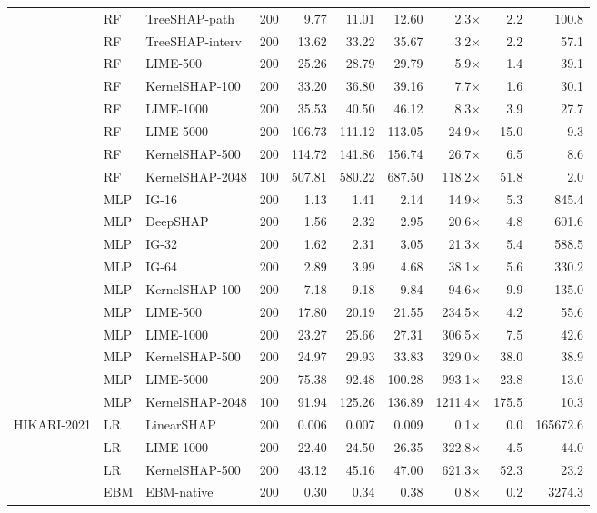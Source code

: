 \begin{longtable}{lllrrrrrrr}
 & RF & TreeSHAP-path & 200 & 9.77 & 11.01 & 12.60 & 2.3$\times$ & 2.2 & 100.8 \\
 & RF & TreeSHAP-interv & 200 & 13.62 & 33.22 & 35.67 & 3.2$\times$ & 2.2 & 57.1 \\
 & RF & LIME-500 & 200 & 25.26 & 28.79 & 29.79 & 5.9$\times$ & 1.4 & 39.1 \\
 & RF & KernelSHAP-100 & 200 & 33.20 & 36.80 & 39.16 & 7.7$\times$ & 1.6 & 30.1 \\
 & RF & LIME-1000 & 200 & 35.53 & 40.50 & 46.12 & 8.3$\times$ & 3.9 & 27.7 \\
 & RF & LIME-5000 & 200 & 106.73 & 111.12 & 113.05 & 24.9$\times$ & 15.0 & 9.3 \\
 & RF & KernelSHAP-500 & 200 & 114.72 & 141.86 & 156.74 & 26.7$\times$ & 6.5 & 8.6 \\
 & RF & KernelSHAP-2048 & 100 & 507.81 & 580.22 & 687.50 & 118.2$\times$ & 51.8 & 2.0 \\
 & MLP & IG-16 & 200 & 1.13 & 1.41 & 2.14 & 14.9$\times$ & 5.3 & 845.4 \\
 & MLP & DeepSHAP & 200 & 1.56 & 2.32 & 2.95 & 20.6$\times$ & 4.8 & 601.6 \\
 & MLP & IG-32 & 200 & 1.62 & 2.31 & 3.05 & 21.3$\times$ & 5.4 & 588.5 \\
 & MLP & IG-64 & 200 & 2.89 & 3.99 & 4.68 & 38.1$\times$ & 5.6 & 330.2 \\
 & MLP & KernelSHAP-100 & 200 & 7.18 & 9.18 & 9.84 & 94.6$\times$ & 9.9 & 135.0 \\
 & MLP & LIME-500 & 200 & 17.80 & 20.19 & 21.55 & 234.5$\times$ & 4.2 & 55.6 \\
 & MLP & LIME-1000 & 200 & 23.27 & 25.66 & 27.31 & 306.5$\times$ & 7.5 & 42.6 \\
 & MLP & KernelSHAP-500 & 200 & 24.97 & 29.93 & 33.83 & 329.0$\times$ & 38.0 & 38.9 \\
 & MLP & LIME-5000 & 200 & 75.38 & 92.48 & 100.28 & 993.1$\times$ & 23.8 & 13.0 \\
 & MLP & KernelSHAP-2048 & 100 & 91.94 & 125.26 & 136.89 & 1211.4$\times$ & 175.5 & 10.3 \\
\midrule
HIKARI-2021 & LR & LinearSHAP & 200 & 0.006 & 0.007 & 0.009 & 0.1$\times$ & 0.0 & 165672.6 \\
 & LR & LIME-1000 & 200 & 22.40 & 24.50 & 26.35 & 322.8$\times$ & 4.5 & 44.0 \\
 & LR & KernelSHAP-500 & 200 & 43.12 & 45.16 & 47.00 & 621.3$\times$ & 52.3 & 23.2 \\
 & EBM & EBM-native & 200 & 0.30 & 0.34 & 0.38 & 0.8$\times$ & 0.2 & 3274.3 \\

\end{longtable}
